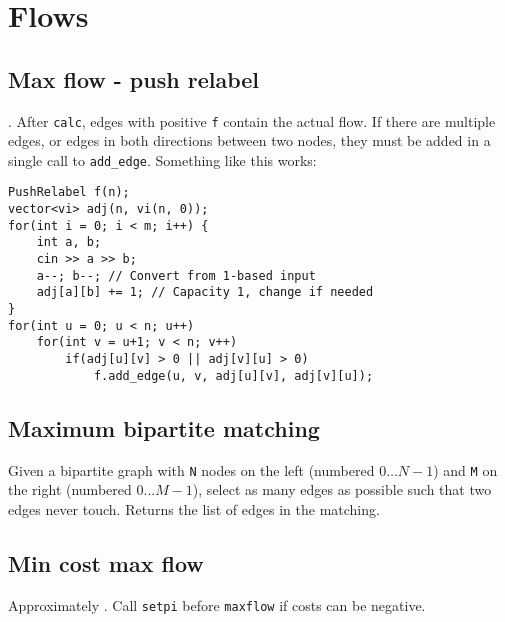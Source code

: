 \section{Flows}

\subsection{Max flow - push relabel}
. After \verb|calc|, edges with positive \verb|f| contain the actual flow.
\warning If there are multiple edges, or edges in both directions between two nodes, they must be added in a single call to \texttt{add\_edge}.
Something like this works:
\begin{lstlisting}
PushRelabel f(n);
vector<vi> adj(n, vi(n, 0));
for(int i = 0; i < m; i++) {
	int a, b;
	cin >> a >> b;
	a--; b--; // Convert from 1-based input
	adj[a][b] += 1; // Capacity 1, change if needed
}
for(int u = 0; u < n; u++)
	for(int v = u+1; v < n; v++)
		if(adj[u][v] > 0 || adj[v][u] > 0)
			f.add_edge(u, v, adj[u][v], adj[v][u]);
\end{lstlisting}

\subsection{Maximum bipartite matching}
Given a bipartite graph with \verb|N| nodes on the left (numbered $0 \ldots N-1$) and \verb|M| on the right (numbered $0 \ldots M-1$), select as many edges as possible such that two edges never touch. Returns the list of edges in the matching.

\subsection{Min cost max flow}
Approximately . Call \texttt{setpi} before \texttt{maxflow} if costs can be negative.
